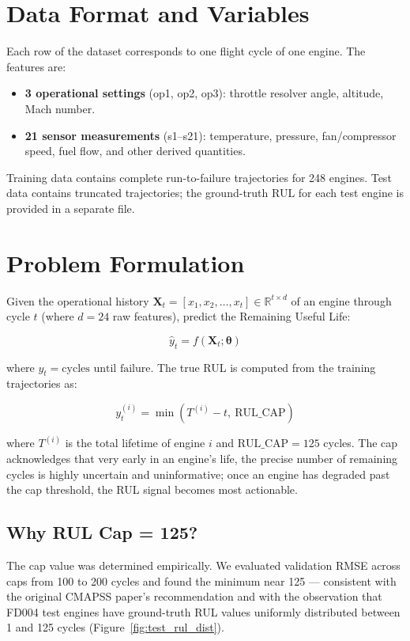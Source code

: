 \documentclass[12pt,a4paper]{report}
\begin{document}
\section{Data Format and Variables}

Each row of the dataset corresponds to one flight cycle of one engine. The features are:
\begin{itemize}[leftmargin=1.5cm]
  \item \textbf{3 operational settings} (op1, op2, op3): throttle resolver angle, altitude, Mach number.
  \item \textbf{21 sensor measurements} (s1--s21): temperature, pressure, fan/compressor speed, fuel flow, and other derived quantities.
\end{itemize}

Training data contains complete run-to-failure trajectories for 248 engines. Test data contains truncated trajectories; the ground-truth RUL for each test engine is provided in a separate file.

\section{Problem Formulation}

Given the operational history $\mathbf{X}_t = [x_1, x_2, \ldots, x_t] \in \mathbb{R}^{t \times d}$ of an engine through cycle $t$ (where $d = 24$ raw features), predict the Remaining Useful Life:

\[
\hat{y}_t = f(\mathbf{X}_t; \boldsymbol{\theta})
\]

where $y_t = \text{cycles until failure}$. The true RUL is computed from the training trajectories as:

\[
y_t^{(i)} = \min\left(T^{(i)} - t,\ \text{RUL\_CAP}\right)
\]

where $T^{(i)}$ is the total lifetime of engine $i$ and $\text{RUL\_CAP} = 125$ cycles. The cap acknowledges that very early in an engine's life, the precise number of remaining cycles is highly uncertain and uninformative; once an engine has degraded past the cap threshold, the RUL signal becomes most actionable.

\subsection{Why RUL Cap = 125?}

The cap value was determined empirically. We evaluated validation RMSE across caps from 100 to 200 cycles and found the minimum near 125 — consistent with the original CMAPSS paper's recommendation and with the observation that FD004 test engines have ground-truth RUL values uniformly distributed between 1 and 125 cycles (Figure~\ref{fig:test_rul_dist}).
\end{document}
